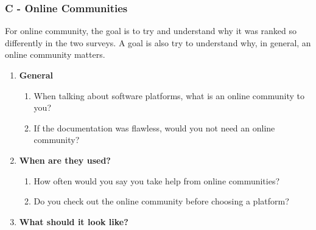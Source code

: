 \documentclass{cslthse-msc}
\begin{document}
    \subsubsection{C - Online Communities}
    For online community, the goal is to try and understand why it was ranked
    so differently in the two surveys. A goal is also try to understand why, in general,
    an online community matters.

    \begin{enumerate}[label=C\Alph*]
        \item \textbf{General}
        \begin{enumerate}[label={CA\arabic*}]
            \item	When talking about software platforms, what is an online community to you?
            \item	If the documentation was flawless, would you not need an online community?
        \end{enumerate}
        \item \textbf{When are they used?}
        \begin{enumerate}[label={CB\arabic*}]
            \item	How often would you say you take help from online communities?
            \item   Do you check out the online community before choosing a platform?
        \end{enumerate}
        \item \textbf{What should it look like?}


\end{enumerate}
\end{document}
